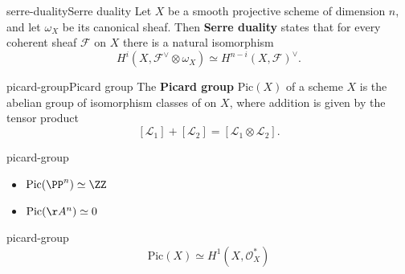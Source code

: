 
    

    


\begin{topic}{serre-duality}{Serre duality}
    Let $X$ be a smooth projective scheme of dimension $n$, and let $\omega_X$ be its canonical sheaf. Then \textbf{Serre duality} states that for every coherent sheaf $\mathcal{F}$ on $X$ there is a natural isomorphism
    \[ H^i(X, \mathcal{F}^\vee \otimes \omega_X) \simeq H^{n - i}(X, \mathcal{F})^\vee . \]
\end{topic}

\begin{topic}{picard-group}{Picard group}
    The \textbf{Picard group} $\text{Pic}(X)$ of a scheme $X$ is the abelian group of isomorphism classes of  on $X$, where addition is given by the tensor product
    \[ [\mathcal{L}_1] + [\mathcal{L}_2] = [\mathcal{L}_1 \otimes \mathcal{L}_2] . \]
\end{topic}

\begin{example}{picard-group}
    \begin{itemize}
        \item $\text{Pic}(\PP^n) \simeq \ZZ$
        \item $\text{Pic}(\AA^n) \simeq 0$
    \end{itemize}
\end{example}

\begin{example}{picard-group}
    \[ \text{Pic}(X) \simeq H^1(X, \mathcal{O}_X^*) \]
\end{example}

